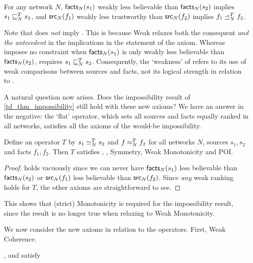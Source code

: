 \begin{axiom}[\weakcoherence{}]

For any network $N$, $\mathsf{facts}_N(s_1)$ weakly less believable than
$\mathsf{facts}_N(s_2)$ implies $s_1 \sqsubseteq_N^T s_2$, and $\mathsf{src}_N(f_1)$ weakly less
trustworthy than $\mathsf{src}_N(f_2)$ implies $f_1 \preceq_N^T f_2$.

\end{axiom}

Note that \coherence{} does \emph{not} imply \weakcoherence{}. This is because Weak
\coherence{} relaxes both the consequent \emph{and the antecedent} in the
implications in the statement of the axiom. Whereas \coherence{} imposes no
constraint when $\mathsf{facts}_N(s_1)$ is only weakly less believable than
$\mathsf{facts}_N(s_2)$, \weakcoherence{} requires $s_1 \sqsubseteq_N^T s_2$. Consequently, the
`weakness' of \weakcoherence{} refers to its use of weak comparisons between
sources and facts, not its logical strength in relation to \coherence{}.

A natural question now arises. Does the impossibility result of
\cref{td_thm_impossibility} still hold with these new axioms? We have an answer in
the negative: the `flat' operator, which sets all sources and facts equally
ranked in all networks, satisfies all the axioms of the would-be impossibility.

\begin{proposition}
    Define an operator $T$ by $s_1 \simeq_N^T s_2$ and $f \approx_N^T f_2$ for all
    networks $N$, sources $s_1, s_2$ and facts $f_1, f_2$. Then $T$ satisfies
    \coherence{}, \weakcoherence{}, Symmetry, Weak Monotonicity and POI.
\end{proposition}

\begin{proof}
    \coherence{} holds vacuously since we can never have $\mathsf{facts}_N(s_1)$ less
    believable than $\mathsf{facts}_N(s_2)$ or $\mathsf{src}_N(f_1)$ less believable than
    $\mathsf{src}_N(f_2)$. Since \emph{any} weak ranking holds for $T$, the other
    axioms are straightforward to see.
\end{proof}

This shows that (strict) Monotonicity is required for the impossibility result,
since the result is no longer true when relaxing to Weak Monotonicity.

We now consider the new axioms in relation to the operators. First, Weak
Coherence.

\begin{proposition}
    \label{td_prop_weak_coherence_satisfaction}
    \voting{}, \sums{} and \usums{} satisfy \weakcoherence{}
\end{proposition}

